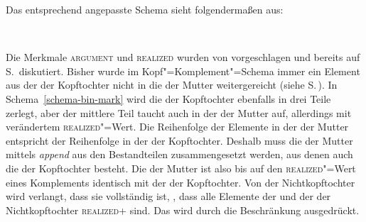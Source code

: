 {Das entsprechend angepasste Schema sieht folgendermaßen aus:
\begin{schema}
\label{schema-bin-mark}
 \impl\\
\end{schema}
\largerpage

\noindent
Die Merkmale \textsc{argument} und \textsc{realized} wurden von \citet[236]{Prze99} vorgeschlagen
und bereits auf S.\,\pageref{page-realized} diskutiert. Bisher wurde im Kopf"=Komplement"=Schema
immer ein Element aus der \compsl der Kopftochter nicht in die \compsl der Mutter weitergereicht
(siehe S.\,\pageref{schema-Kopf-Komplementschema-prel2}). In
Schema~\ref{schema-bin-mark} wird die \compsl der Kopftochter ebenfalls in drei Teile zerlegt, aber
der mittlere Teil taucht auch in der \compsl der Mutter auf, allerdings mit verändertem 
\textsc{realized}"=Wert. Die Reihenfolge der Elemente in der \compsl der Mutter entspricht der Reihenfolge in der \compsl der Kopftochter. Deshalb muss
die \compsl der Mutter mittels \emph{append}
aus den Bestandteilen zusammengesetzt werden, aus denen auch die \compsl der Kopftochter
besteht. Die \compsl der Mutter ist also bis auf den \textsc{realized}"=Wert eines Komplements
identisch mit der \compsl der Kopftochter. Von der Nichtkopftochter wird verlangt, dass sie
vollständig ist, \dash, dass alle Elemente der \sprl und der \compsl der Nichtkopftochter \textsc{realized}+
sind. Das wird durch die Beschränkung  ausgedrückt. 

}
